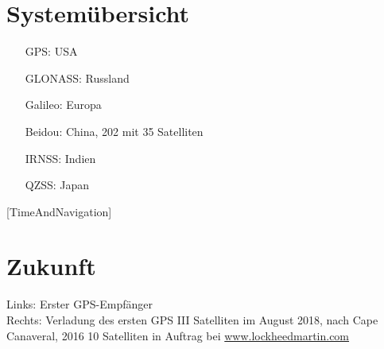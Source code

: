\section{Systemübersicht}
\begin{itemize}
    \item[GPS:] USA
    \item[GLONASS:] Russland
    \item[Galileo:] Europa
    \item[Beidou:] China, 202 mit 35 Satelliten
    \item[IRNSS:] Indien
    \item[QZSS:] Japan
\end{itemize}
{\small [TimeAndNavigation]}

\section{Zukunft}
\label{sec:zukunft}
Links: Erster GPS-Empfänger \\
Rechts: Verladung des ersten GPS III Satelliten im August 2018, nach Cape Canaveral, 2016 10 Satelliten in Auftrag bei \url{www.lockheedmartin.com}
